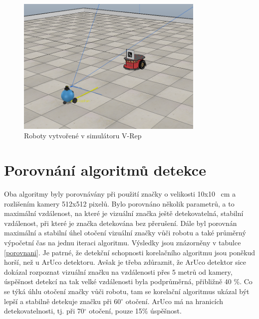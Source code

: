 \documentclass[twoside]{ctuthesis}
\theoremstyle{plain}
\theoremstyle{definition}
\theoremstyle{note}
\begin{document}
\begin{figure}
	\caption{Roboty vytvořené v simulátoru V-Rep}

	\label{robots}
	\includegraphics[width=0.8\textwidth]{images/5/robots.png}
\end{figure}
\section{Porovnání algoritmů detekce}

Oba algoritmy byly porovnávány při použití značky o velikosti 10x10 \SI{}{cm} a rozlišením kamery 512x512 pixelů. Bylo porovnáno několik parametrů, a to maximální vzdálenost, na které je vizuální značka ještě detekovatelná, stabilní vzdálenost, při které je značka detekována bez přerušení. Dále byl porovnán maximální a stabilní úhel otočení vizuální značky vůči robotu a také průměrný výpočetní čas na jednu iteraci algoritmu. Výsledky jsou znázorněny v tabulce \ref{porovnani}. Je patrné, že detekční schopnosti korelačního algoritmu jsou poněkud horší, než u ArUco detektoru. Avšak je třeba zdůraznit, že ArUco detektor sice dokázal rozpoznat vizuální značku na vzdálenosti přes 5 metrů od kamery, úspěšnost detekcí na tak velké vzdálenosti byla podprůměrná, přibližně 40 \%. Co se týká úhlu otočení značky vůči robotu, tam se korelační algoritmus ukázal být lepší a stabilně detekuje značku při 60$^\circ$ otočení. ArUco má na hranicích detekovatelnosti, tj. při 70$^\circ$ otočení, pouze 15\% úspěšnost.
\end{document}
